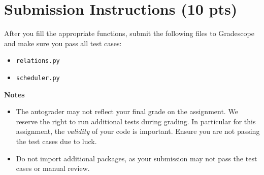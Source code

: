 \documentclass{article}
\begin{document}
\section*{Submission Instructions (10 pts)}
    After you fill the appropriate functions, submit the following files to Gradescope and make sure you pass all test cases:
    \begin{itemize}
        \item \lstinline{relations.py}
        \item \lstinline{scheduler.py}
    \end{itemize}

    \vspace{3mm}
    \textbf{Notes}

    \begin{itemize}
        \item The autograder may not reflect your final grade on the assignment. We reserve the right to run additional tests during grading. In particular for this assignment, the \textit{validity} of your code is important. Ensure you are not passing the test cases due to luck.
        \item Do not import additional packages, as your submission may not pass the test cases or manual review.
    \end{itemize}
    
\end{document}
